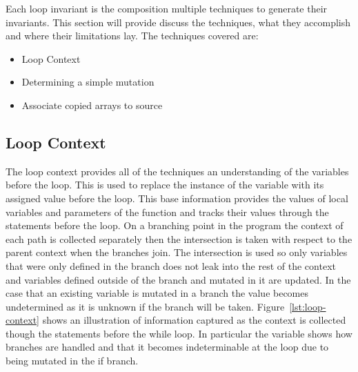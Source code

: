 Each loop invariant is the composition multiple techniques to generate their
invariants. This section will provide discuss the techniques, what they
accomplish and where their limitations lay.
The techniques covered are:

\begin{itemize}
    \item{Loop Context}
    \item{Determining a simple mutation}
    \item{Associate copied arrays to source}
\end{itemize}

\subsection{Loop Context}\label{s:loop-context}


The loop context provides all of the techniques an understanding of the
variables before the loop.
This is used to replace the instance of the variable with its assigned value
before the loop.
This base information provides the values of local variables and parameters of
the function and tracks their values through the statements before the loop.
On a branching point in the program the context of each path is collected
separately then the intersection is taken with respect to the
parent context when the branches join.
The intersection is used so only variables that were only defined in the
branch does not leak into the rest of the context and variables defined outside
of the branch and mutated in it are updated.
In the case that an existing variable is mutated in a branch the value becomes
undetermined as it is unknown if the branch will be taken.
Figure~\ref{lst:loop-context} shows an illustration of information captured as
the context is collected though the statements before the while loop.
In particular the variable  shows how branches are handled
and that it becomes indeterminable at the loop due to being mutated in the if
branch.

